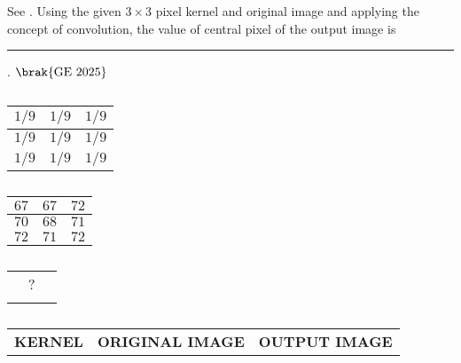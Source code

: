 \item 
    See .
	Using the given $3 \times 3$ pixel kernel and original image and applying the concept of convolution, the value of central pixel of the output image is \rule{2cm}{0.5mm}. 
\hfill $\brak{\text{GE 2025}}$
\begin{table}[H]
    \centering
    \begin{tabular}{|c|c|c|}
        \hline
        $1/9$ & $1/9$ & $1/9$ \\
        \hline
        $1/9$ & $1/9$ & $1/9$ \\
        \hline
        $1/9$ & $1/9$ & $1/9$ \\
        \hline
    \end{tabular}
    \hspace{2cm} %
    \begin{tabular}{|c|c|c|}
    
    \hline
        $67$ & $67$ & $72$ \\
        \hline
        $70$ & $68$ & $71$ \\
        \hline
        $72$ & $71$ & $72$ \\
        \hline
    \end{tabular}
    \hspace{2cm} %
    \begin{tabular}{|c|c|c|}
        \hline
        
& & \\
        \hline
        & \huge{?} & \\
        \hline
        & & \\
        \hline
    \end{tabular}
    
    \vspace{0.5cm} %
    
    \begin{tabular}{c c c}
        \hspace{2cm}
        \textbf{KERNEL} & \hspace{1cm} \textbf{ORIGINAL IMAGE} & \hspace{1cm} \textbf{OUTPUT 
IMAGE}
    \end{tabular}
    \caption{}
    \label{tab:2025/ge}
\end{table}

